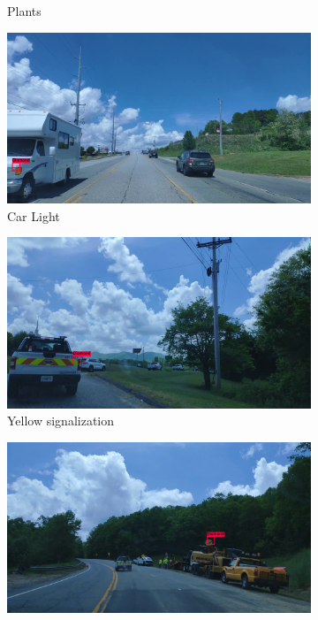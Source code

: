 \begin{figure}
\begin{center}
\begin{subfigure}[t]{.49\linewidth}
      \caption{Plants}
      \label{fig:plantFP}
    \end{subfigure}
    \begin{subfigure}[t]{.49\linewidth}
      \centering
      \includegraphics[width=0.99\linewidth]{figures/examples/sr2/FP/FP_19.png}
      \caption{Car Light}
      \label{fig:carLightFP}
    \end{subfigure}
    \begin{subfigure}[t]{.49\linewidth}
      \centering
      \includegraphics[width=0.99\linewidth]{figures/examples/sr2/FP/FP_01.png}
      \caption{Yellow signalization}
      \label{fig:GDOTtruckFP}
    \end{subfigure}
    \begin{subfigure}[t]{.49\linewidth}
      \centering
      \includegraphics[width=0.99\linewidth]{figures/examples/sr2/FP/FP_03.png}

\end{subfigure}
\end{center}
\end{figure}
